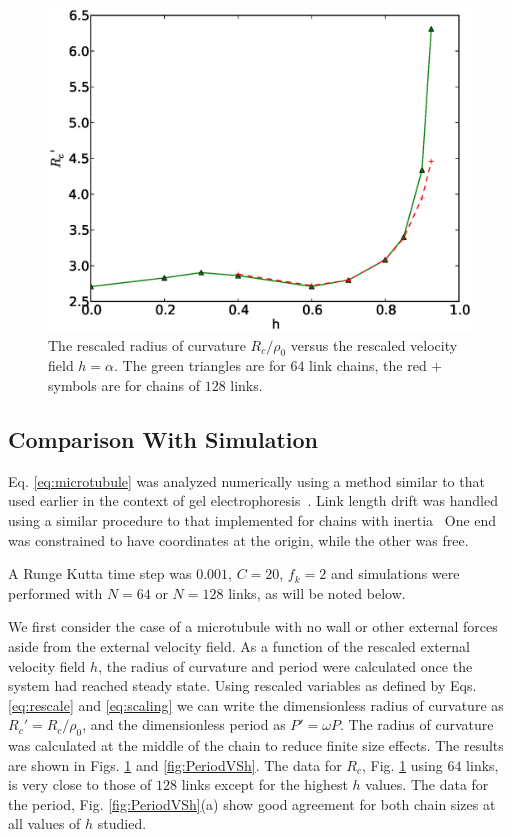 \documentclass[11pt]{ucthesis}
\begin{document}
\begin{figure}[t]
\begin{center}
\includegraphics[width=\hsize]{rad_curv_vs_h.eps}
\caption{ 
The rescaled radius of curvature $R_c/\rho_0$ versus the rescaled velocity field $h=\alpha$.
The green triangles are for $64$ link chains, the red $+$ symbols are for chains of $128$ links.
}
\label{fig:RadCurvVSh}
\end{center}
\end{figure}

\subsection{Comparison With Simulation}
\label{subsec:CompWithSims}

Eq.  \ref{eq:microtubule} was analyzed numerically using a method similar to that
used earlier in the context of gel electrophoresis~\cite{DeutschElectrophoresisScience,DeutschMadden}.
Link length drift was handled using a similar procedure to that implemented for chains with inertia~\cite{DeutschCerfFriction}
One end was constrained to have coordinates at the origin, while the other was free. 

A Runge Kutta time step was $0.001$, $C = 20$, $f_k = 2$ and simulations were performed with $N=64$ or $N=128$ links,
as will be noted below.

We first consider the case of a microtubule with no wall or other external forces aside from the external velocity field.
As a function of the rescaled external velocity field $h$, the radius of curvature and period were calculated once the
system had reached steady state. Using rescaled variables as defined by Eqs. \ref{eq:rescale} and \ref{eq:scaling} we
can write the dimensionless radius of curvature as $R_c' = R_c/\rho_0$, and the dimensionless period as $P' = \omega P$.
The radius of curvature was calculated at the middle of the chain to reduce finite size effects.
The results are shown in Figs.  \ref{fig:RadCurvVSh} and \ref{fig:PeriodVSh}. The data for $R_c$, Fig. \ref{fig:RadCurvVSh} using
$64$ links, is very close to those of $128$ links except for the highest $h$ values. The data for the period, Fig. \ref{fig:PeriodVSh}(a)
show good agreement for both chain sizes at all values of $h$ studied.
\end{document}
